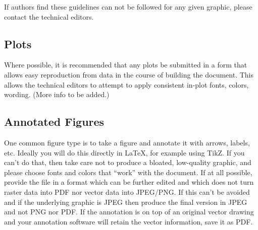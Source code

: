 \noindent If authors find these guidelines can not be followed for any
given graphic, please contact the technical editors.   

\subsection{Plots}
\label{sec:plots}

Where possible, it is recommended that any plots be submitted in a
form that allows easy reproduction from data in the course of building
the document.
This allows the technical editors to attempt to apply consistent
in-plot fonts, colors, wording.
(More info to be added.)

\subsection{Annotated Figures}
\label{sec:annotate}

One common figure type is to take a figure and annotate it with
arrows, labels, etc.
Ideally you will do this directly in LaTeX, for example using TikZ.
If you can't do that, then take care not to produce a bloated,
low-quality graphic, and please choose fonts and colors that ``work''
with the document.
If at all possible, provide the file in a format which can be further
edited and which does not turn raster data into PDF nor vector data
into JPEG/PNG.
If this can't be avoided and if the underlying graphic is JPEG then
produce the final version in JPEG and not PNG nor PDF.
If the annotation is on top of an original vector drawing and your
annotation software will retain the vector information, save it as
PDF.

